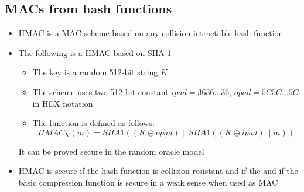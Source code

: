 \subsection{MACs from hash functions}
\begin{itemize}
  \item HMAC is a MAC scheme based on any collision intractable hash function

  \item The following is a HMAC based on SHA-1
  \begin{itemize}
  	\item The key is a random 512-bit string $K$
  	\item The scheme uses two 512 bit constant $ipad = 3636 \dots 36$, $opad = 5C5C \dots 5C$ in HEX notation
  	\item The function is defined as follows:
    \begin{equation}
      HMAC_{K}(m)=S H A 1((K \oplus opad)\|S H A 1((K \oplus ipad) \| m))
    \end{equation}
  \end{itemize}
  It can be proved secure in the random oracle model
  \item HMAC is secure if the hash function is collision resistant and if the and if the basic compression function is secure in a weak sense when used as MAC

\end{itemize}

\newpage

